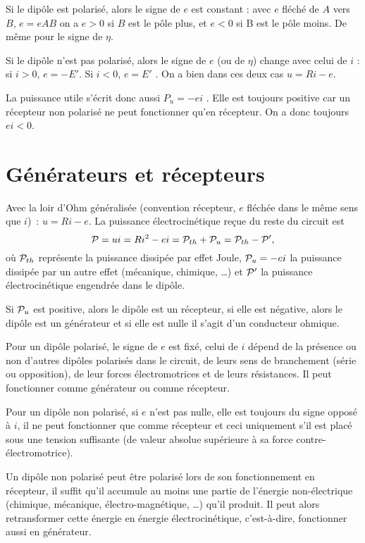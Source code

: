 Si le dipôle est polarisé, alors le signe de \(e\) est constant : avec \(e\) fléché de \(A\) vers \(B\), \(e = eAB\) on a \(e > 0\) si \(B\) est le pôle plus, et \(e < 0\) si B est le pôle moins. De même pour le signe de \(\eta\).

Si le dipôle n'est pas polarisé, alors le signe de \(e\) (ou de \(\eta\)) change avec celui de \(i\) : si \(i > 0\), \(e = -E'\). Si \(i < 0\), \(e = E'\) . On a bien dans ces deux cas \(u = R i - e\).

La puissance utile s'écrit donc aussi \(P_u = - e i\) . Elle est toujours positive car un récepteur non polarisé ne peut fonctionner qu'en récepteur. On a donc toujours \(ei < 0\).

\section{Générateurs et récepteurs}
Avec la loir d'Ohm généralisée (convention récepteur, \(e\) fléchée dans le même sens que \(i\))~: \(u=Ri-e\). La puissance électrocinétique reçue du reste du circuit est
\begin{equation}
	\P = ui = Ri^2 - ei = \P_{th}+ \P_u = \P_{th} - \P',
\end{equation}
où \(\P_{th}\) représente la puissance dissipée par effet Joule, \(\P_u=-ei\) la puissance dissipée par un autre effet (mécanique, chimique, \ldots{}) et \(\P'\) la puissance électrocinétique engendrée dans le dipôle.

Si \(\P_u\) est positive, alors le dipôle est un récepteur, si elle est négative, alors le dipôle est un générateur et si elle est nulle il s'agit d'un conducteur ohmique.

Pour un dipôle polarisé, le signe de \(e\) est fixé, celui de \(i\) dépend de la présence ou non d'autres dipôles polarisés dans le circuit, de leurs sens de branchement (série ou opposition), de leur forces électromotrices et de leurs résistances. Il peut fonctionner comme générateur ou comme récepteur.

Pour un dipôle non polarisé, si \(e\) n'est pas nulle, elle est toujours du signe opposé à \(i\), il ne peut fonctionner que comme récepteur et ceci uniquement s'il est placé sous une tension suffisante (de valeur absolue supérieure à sa force contre-électromotrice).

Un dipôle non polarisé peut être polarisé lors de son fonctionnement en récepteur, il suffit qu'il accumule au moins une partie de l'énergie non-électrique (chimique, mécanique, électro-magnétique, \ldots{}) qu'il produit. Il peut alors retransformer cette énergie en énergie électrocinétique, c'est-à-dire, fonctionner aussi en générateur.

